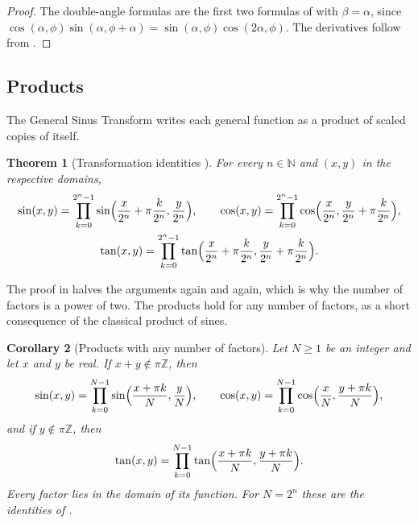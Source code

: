 \documentclass[11pt,a4paper]{amsart}
\theoremstyle{plain}
\newtheorem{theorem}{Theorem}[section]
\newtheorem{corollary}[theorem]{Corollary}
\theoremstyle{definition}
\theoremstyle{remark}
\begin{document}
\begin{proof}
The double-angle formulas are the first two formulas of  with $\beta = \alpha$, since $\cos(\alpha, \phi)\sin(\alpha, \phi + \alpha) = \sin(\alpha, \phi)\cos(2\alpha, \phi)$. The derivatives follow from .
\end{proof}

\subsection{Products}\label{subsec:gs-products}

The General Sinus Transform writes each general function as a product of scaled copies of itself.

\begin{theorem}[Transformation identities {\citep[Theorem~6.1]{Derraz2026GSP}}]\label{thm:gs-transform}
For every $n \in \mathbb{N}$ and $(x, y)$ in the respective domains,
\begin{gather*}
\sin(x, y) = \prod_{k=0}^{2^n - 1} \sin\Bigl(\frac{x}{2^n} + \pi\frac{k}{2^n}, \frac{y}{2^n}\Bigr) , \qquad \cos(x, y) = \prod_{k=0}^{2^n - 1} \cos\Bigl(\frac{x}{2^n}, \frac{y}{2^n} + \pi\frac{k}{2^n}\Bigr) , \\
\tan(x, y) = \prod_{k=0}^{2^n - 1} \tan\Bigl(\frac{x}{2^n} + \pi\frac{k}{2^n}, \frac{y}{2^n} + \pi\frac{k}{2^n}\Bigr) .
\end{gather*}
\end{theorem}

The proof in \citep{Derraz2026GSP} halves the arguments again and again, which is why the number of factors is a power of two. The products hold for any number of factors, as a short consequence of the classical product of sines.

\begin{corollary}[Products with any number of factors]\label{thm:every-n}
Let $N \geq 1$ be an integer and let $x$ and $y$ be real. If $x + y \notin \pi\mathbb{Z}$, then
\[
\sin(x, y) = \prod_{k=0}^{N-1} \sin\Bigl(\frac{x + \pi k}{N}, \frac{y}{N}\Bigr) , \qquad \cos(x, y) = \prod_{k=0}^{N-1} \cos\Bigl(\frac{x}{N}, \frac{y + \pi k}{N}\Bigr) ,
\]
and if $y \notin \pi\mathbb{Z}$, then
\[
\tan(x, y) = \prod_{k=0}^{N-1} \tan\Bigl(\frac{x + \pi k}{N}, \frac{y + \pi k}{N}\Bigr) .
\]
Every factor lies in the domain of its function. For $N = 2^n$ these are the identities of .
\end{corollary}
\end{document}
